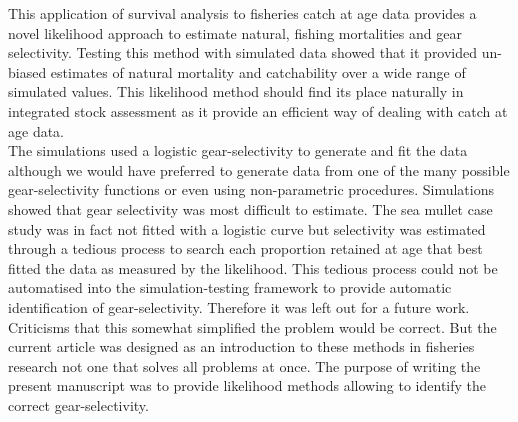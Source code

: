This application of survival analysis to fisheries catch at age data provides a novel likelihood approach to estimate natural, fishing mortalities and gear selectivity. Testing this method with simulated data showed that it provided un-biased estimates of natural mortality and catchability over a wide range of simulated values. This likelihood method should find its place naturally in integrated stock assessment \citep{Maunder201361} as it provide an efficient way of dealing with catch at age data.\\


The simulations used a logistic gear-selectivity to generate and fit the data although we would have preferred to generate data from one of the many possible gear-selectivity functions or even using non-parametric procedures. Simulations showed that gear selectivity was most difficult to estimate. The sea mullet case study was in fact not fitted with a logistic curve but selectivity was estimated through a tedious process to search each proportion retained at age that best fitted the data as measured by the likelihood. This tedious process could not be automatised into the simulation-testing framework to provide automatic identification of gear-selectivity. Therefore it was left out for a future work. Criticisms that this somewhat simplified the problem would be correct. But the current article was designed as an introduction to these methods in fisheries research not one that solves all problems at once. The purpose of writing the present manuscript was to provide likelihood methods allowing to identify the correct gear-selectivity. \\ %




